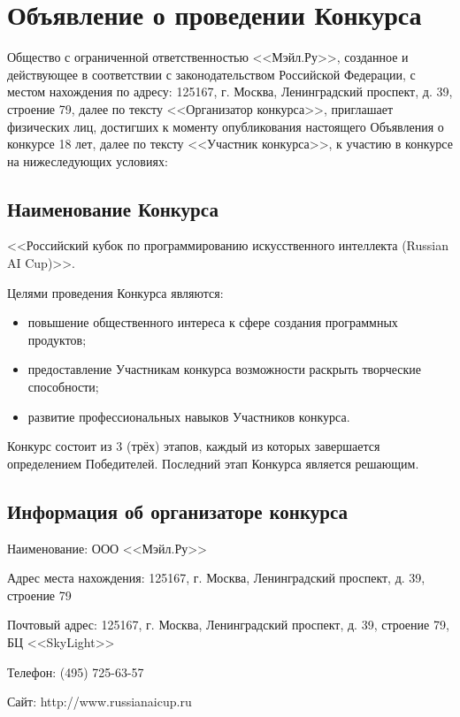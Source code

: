\setlength{\parskip}{0.125in}

\chapter{Объявление о проведении Конкурса}

Общество с ограниченной ответственностью <<Мэйл.Ру>>, созданное и действующее в соответствии с законодательством Российской Федерации, с
местом нахождения по адресу: 125167, г. Москва, Ленинградский проспект, д. 39, строение 79, далее по тексту <<Организатор конкурса>>,
приглашает физических лиц, достигших к моменту опубликования настоящего Объявления о конкурсе 18 лет, далее по тексту <<Участник конкурса>>,
к участию в конкурсе на нижеследующих условиях:

\section{Наименование Конкурса}

<<Российский кубок по программированию искусственного интеллекта (Russian AI Cup)>>.

Целями проведения Конкурса являются:
\begin{itemize}
\item повышение общественного интереса к сфере создания программных продуктов;
\item предоставление Участникам конкурса возможности раскрыть творческие способности;
\item развитие профессиональных навыков Участников конкурса.
\end{itemize}

Конкурс состоит из 3 (трёх) этапов, каждый из которых завершается определением Победителей. Последний этап Конкурса является решающим.

\section{Информация об организаторе конкурса}

Наименование: ООО <<Мэйл.Ру>>

Адрес места нахождения: 125167, г. Москва, Ленинградский проспект, д. 39, строение 79

Почтовый адрес: 125167, г. Москва, Ленинградский проспект, д. 39, строение 79, БЦ <<SkyLight>>

Телефон: (495) 725-63-57

Сайт: http://www.russianaicup.ru

